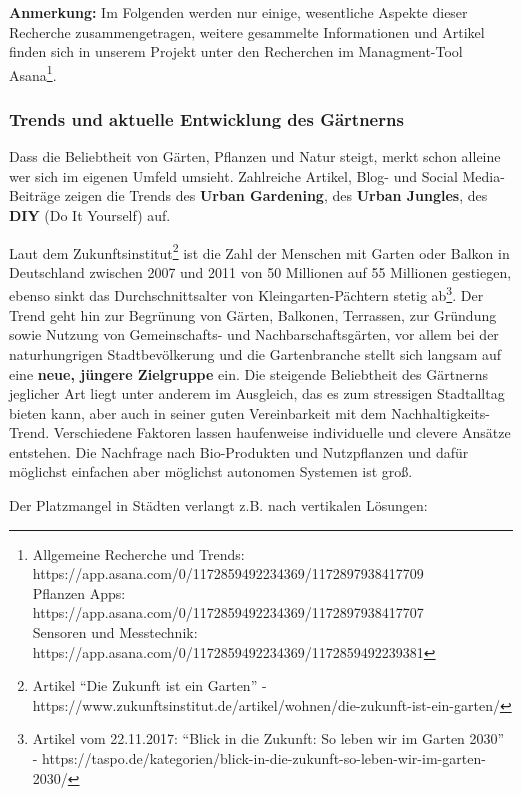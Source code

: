\textbf{Anmerkung:} Im Folgenden werden nur einige, wesentliche Aspekte
dieser Recherche zusammengetragen, weitere gesammelte Informationen und
Artikel finden sich in unserem Projekt unter den Recherchen im
Managment-Tool Asana\footnote{Allgemeine Recherche und Trends:
  https://app.asana.com/0/1172859492234369/1172897938417709\\
  Pflanzen Apps:
  https://app.asana.com/0/1172859492234369/1172897938417707\\
  Sensoren und Messtechnik:
  https://app.asana.com/0/1172859492234369/1172859492239381}.

\hypertarget{trends-und-aktuelle-entwicklung-des-guxe4rtnerns}{%
\subsubsection{Trends und aktuelle Entwicklung des
Gärtnerns}\label{trends-und-aktuelle-entwicklung-des-guxe4rtnerns}}

Dass die Beliebtheit von Gärten, Pflanzen und Natur steigt, merkt schon
alleine wer sich im eigenen Umfeld umsieht. Zahlreiche Artikel, Blog-
und Social Media-Beiträge zeigen die Trends des \textbf{Urban
Gardening}, des \textbf{Urban Jungles}, des \textbf{DIY} (Do It
Yourself) auf.

Laut dem Zukunftsinstitut\footnote{Artikel ``Die Zukunft ist ein
  Garten'' -
  https://www.zukunftsinstitut.de/artikel/wohnen/die-zukunft-ist-ein-garten/}
ist die Zahl der Menschen mit Garten oder Balkon in Deutschland zwischen
2007 und 2011 von 50 Millionen auf 55 Millionen gestiegen, ebenso sinkt
das Durchschnittsalter von Kleingarten-Pächtern stetig ab\footnote{Artikel
  vom 22.11.2017: ``Blick in die Zukunft: So leben wir im Garten 2030''
  -
  https://taspo.de/kategorien/blick-in-die-zukunft-so-leben-wir-im-garten-2030/}.
Der Trend geht hin zur Begrünung von Gärten, Balkonen, Terrassen, zur
Gründung sowie Nutzung von Gemeinschafts- und Nachbarschaftsgärten, vor
allem bei der naturhungrigen Stadtbevölkerung und die Gartenbranche
stellt sich langsam auf eine \textbf{neue, jüngere Zielgruppe} ein. Die
steigende Beliebtheit des Gärtnerns jeglicher Art liegt unter anderem im
Ausgleich, das es zum stressigen Stadtalltag bieten kann, aber auch in
seiner guten Vereinbarkeit mit dem Nachhaltigkeits-Trend. Verschiedene
Faktoren lassen haufenweise individuelle und clevere Ansätze entstehen.
Die Nachfrage nach Bio-Produkten und Nutzpflanzen und dafür möglichst
einfachen aber möglichst autonomen Systemen ist groß.

Der Platzmangel in Städten verlangt z.B. nach vertikalen Lösungen:

